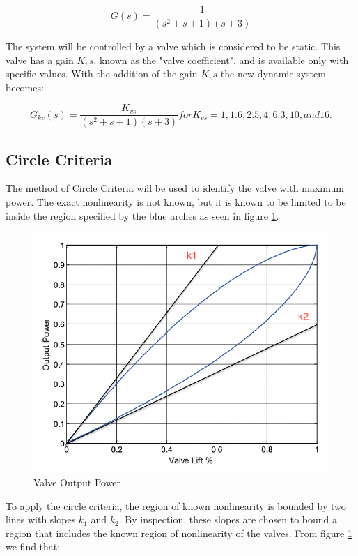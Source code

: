 \documentclass[a4paper, titlepage]{article}
\begin{document}
\begin{equation}
	G(s) = \frac{1}{(s^2+s+1)(s+3)}
	\label{equ:system}
\end{equation}

The system will be controlled by a valve which is considered to be static.  This valve has a gain $K_vs$, known as the "valve coefficient", and is available only with specific values.
With the addition of the gain $K_vs$ the new dynamic system becomes:

\begin{equation}
	G_{kv}(s) = \frac{K_{vs}}{(s^2+s+1)(s+3)} for K_{vs}=1, 1.6, 2.5, 4, 6.3, 10, and 16.
	\label{equ:systemTF}
\end{equation}


\subsection{Circle Criteria}

The method of Circle Criteria will be used to identify the valve with maximum power.  The exact nonlinearity is not known, but it is known to be limited to be inside the region specified by the blue arches as seen in figure \ref{fig:valvepower}.

\begin{figure}[h!]
\center
\includegraphics[scale=0.25]{../figures/valveOutputPower.png}
\caption{Valve Output Power}
\label{fig:valvepower}
\end{figure}

To apply the circle criteria, the region of known nonlinearity is bounded by two lines with slopes $k_{1}$ and $k_{2}$.  By inspection, these slopes are chosen to bound a region that includes the known region of nonlinearity of the valves.  From figure \ref{fig:valvepower} we find that:
\end{document}

